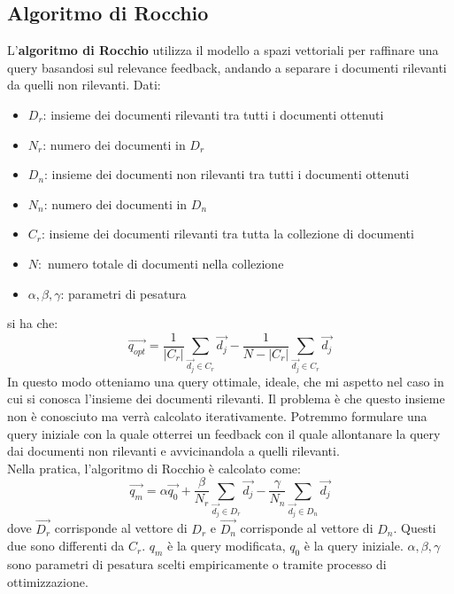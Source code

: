\documentclass{report}
\begin{document}
	\subsection{Algoritmo di Rocchio}
	L'\textbf{algoritmo di Rocchio} utilizza il modello a spazi vettoriali per raffinare una query basandosi sul relevance feedback, andando a separare i documenti rilevanti da quelli non rilevanti.
	Dati:
	\begin{itemize}
		\item $D_r$: insieme dei documenti rilevanti tra tutti i documenti ottenuti
		\item $N_r$: numero dei documenti in $D_r$
		\item $D_n$: insieme dei documenti non rilevanti tra tutti i documenti ottenuti
		\item $N_n$: numero dei documenti in $D_n$
		\item $C_r$: insieme dei documenti rilevanti tra tutta la collezione di documenti
		\item $N:$ numero totale di documenti nella collezione
		\item $\alpha, \beta, \gamma$: parametri di pesatura
	\end{itemize}
	si ha che:
	\[
		\overrightarrow{q_{opt}} = \frac{1}{|C_r|} \sum_{\overrightarrow{d_j} \in C_r} \overrightarrow{d_j} - \frac{1}{N - |C_r|} \sum_{\overrightarrow{d_j} \in C_r} \overrightarrow{d_j}
	\]
	In questo modo otteniamo una query ottimale, ideale, che mi aspetto nel caso in cui si conosca l'insieme dei documenti rilevanti. Il problema è che questo insieme non è conosciuto ma verrà calcolato iterativamente. Potremmo formulare una query iniziale con la quale otterrei un feedback con il quale allontanare la query dai documenti non rilevanti e avvicinandola a quelli rilevanti.
	\vspace{\baselineskip}\\
	Nella pratica, l'algoritmo di Rocchio è calcolato come:
	\[
		\overrightarrow{q_m} = \alpha \overrightarrow{q_0} + \frac{\beta}{N_r} \sum_{\overrightarrow{d_j} \in D_r} \overrightarrow{d_j} - \frac{\gamma}{N_n} \sum_{\overrightarrow{d_j} \in D_n} \overrightarrow{d_j}
	\]
	dove $\overrightarrow{D_r}$ corrisponde al vettore di $D_r$ e $\overrightarrow{D_n}$ corrisponde al vettore di $D_n$. Questi due sono differenti da $C_r$. $q_m$ è la query modificata, $q_0$ è la query iniziale. $\alpha, \beta, \gamma$ sono parametri di pesatura scelti empiricamente o tramite processo di ottimizzazione.
\end{document}

